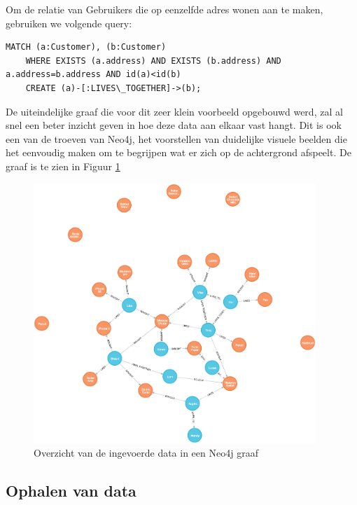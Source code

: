 Om de relatie van Gebruikers die op eenzelfde adres wonen aan te maken, gebruiken we volgende query: 

\begin{lstlisting}[caption={Neo4j query voor het aanmaken van een relatie tussen een twee klanten.}]
	MATCH (a:Customer), (b:Customer) 
	WHERE EXISTS (a.address) AND EXISTS (b.address) AND a.address=b.address AND id(a)<id(b) 
	CREATE (a)-[:LIVES\_TOGETHER]->(b); 
\end{lstlisting}

De uiteindelijke graaf die voor dit zeer klein voorbeeld opgebouwd werd, zal al snel een beter inzicht geven in hoe deze data aan elkaar vast hangt. Dit is ook een van de troeven van Neo4j, het voorstellen van duidelijke visuele beelden die het eenvoudig maken om te begrijpen wat er zich op de achtergrond afspeelt. De graaf is te zien in Figuur \ref{fig:neo4jfullgraph}
\newpage

\begin{figure} [h!]
	\centering
	\includegraphics[width=0.95\textwidth]{img/full_graph_result}
	\caption{Overzicht van de ingevoerde data in een Neo4j graaf}
	\label{fig:neo4jfullgraph}
\end{figure}


\subsection{Ophalen van data}
\label{sec:Neo4j Ophalen van data}

